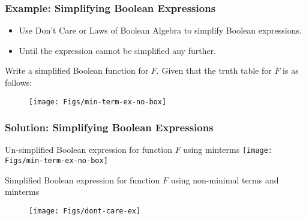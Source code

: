 \begin{frame}\frametitle{Example: Simplifying Boolean Expressions}
\begin{itemize}
    \item Use Don't Care or Laws of Boolean Algebra to simplify Boolean expressions. 
    \item Until the expression cannot be simplified any further.
\end{itemize}
\begin{tcolorbox}[enhanced,attach boxed title to top center={yshift=-3mm,yshifttext=-1mm},
  colback=red!5!white,colframe=red!75!black,colbacktitle=red!80!black,
  title=Try this,fonttitle=\bfseries,
  boxed title style={size=small,colframe=red!50!black} ]
  Write a simplified Boolean function for $F$. Given that the truth table for $F$ is as follows:  
\begin{figure}[H]
\centering
	{\texttt{[image: Figs/min-term-ex-no-box]}}
\end{figure}
\end{tcolorbox}

\end{frame}

\ifnum{}
\begin{frame}\frametitle{Solution: Simplifying Boolean Expressions}

\begin{multicols}{2}
Un-simplified Boolean expression for function $F$ using minterms
{\texttt{[image: Figs/min-term-ex-no-box]}}

\columnbreak

Simplified Boolean expression for function $F$ using non-minimal terms and minterms
\begin{figure}[H]

 {\texttt{[image: Figs/dont-care-ex]}}
\end{figure}

\end{multicols}

\end{frame}
\fi

